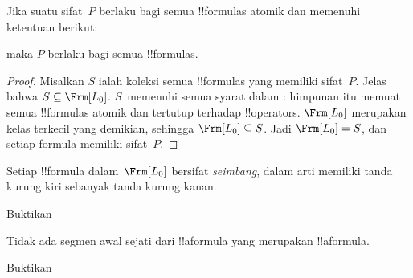 \documentclass[../../../include/open-logic-section]{subfiles}
\begin{document}


\begin{thm}
  Jika suatu sifat~$P$ berlaku bagi semua !!{formula}s atomik dan memenuhi
  ketentuan berikut:
  \begin{enumerate}
  \end{enumerate}
  maka $P$ berlaku bagi semua !!{formula}s.
\end{thm}

\begin{proof}
  Misalkan $S$ ialah koleksi semua !!{formula}s yang memiliki sifat~$P$.
  Jelas bahwa $S \subseteq \Frm[L_0]$. $S$~memenuhi semua syarat dalam
  : himpunan itu memuat semua !!{formula}s atomik dan
  tertutup terhadap !!{operator}s. $\Frm[L_0]$ merupakan kelas terkecil yang
  demikian, sehingga $\Frm[L_0] \subseteq S$. Jadi $\Frm[L_0] = S$, dan
  setiap formula memiliki sifat~$P$.
\end{proof}

\begin{prop}
   Setiap !!{formula} dalam~$\Frm[L_0]$ bersifat \emph{seimbang}, dalam arti
   memiliki tanda kurung kiri sebanyak tanda kurung kanan.
\end{prop}

\begin{prob}
Buktikan 
\end{prob}

\begin{prop} 
Tidak ada segmen awal sejati dari !!a{formula} yang merupakan !!a{formula}.
\end{prop}

\begin{prob}
  Buktikan 
\end{prob}
\end{document}

